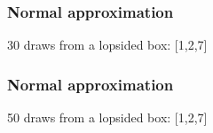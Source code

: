 \documentclass[handout]{beamer}
\begin{document}


   \begin{frame}
   \frametitle{Normal approximation}
   \begin{center}
   \end{center}
   30 draws from a lopsided box: [1,2,7]
   \end{frame}



   \begin{frame}
   \frametitle{Normal approximation}
   \begin{center}
   \end{center}
   50 draws from a lopsided box: [1,2,7]
   \end{frame}


   \begin{frame} 

   \end{frame}


   \begin{frame} 

   \end{frame}

   
\end{document}
